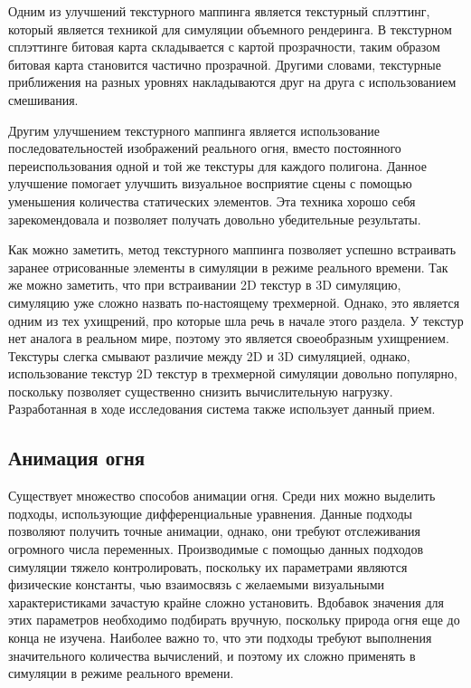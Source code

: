 Одним из улучшений текстурного маппинга является текстурный сплэттинг, который
является техникой для симуляции объемного рендеринга. В текстурном сплэттинге
битовая карта складывается с картой прозрачности, таким образом битовая карта
становится частично прозрачной. Другими словами, текстурные приближения на
разных уровнях накладываются друг на друга с использованием смешивания.

Другим улучшением текстурного маппинга является использование
последовательностей изображений реального огня, вместо постоянного
переиспользования одной и той же текстуры для каждого полигона. Данное улучшение
помогает улучшить визуальное восприятие сцены с помощью уменьшения количества
статических элементов. Эта техника хорошо себя зарекомендовала и позволяет
получать довольно убедительные результаты.

Как можно заметить, метод текстурного маппинга позволяет успешно встраивать
заранее отрисованные элементы в симуляции в режиме реального времени. Так же
можно заметить, что при встраивании 2D текстур в 3D симуляцию, симуляцию уже
сложно назвать по-настоящему трехмерной. Однако, это является одним из тех
ухищрений, про которые шла речь в начале этого раздела. У текстур нет аналога в
реальном мире, поэтому это является своеобразным ухищрением. Текстуры слегка
смывают различие между 2D и 3D симуляцией, однако, использование текстур 2D
текстур в трехмерной симуляции довольно популярно, поскольку позволяет
существенно снизить вычислительную нагрузку. Разработанная в ходе исследования
система также использует данный прием.

\subsection{Анимация огня}

Существует множество способов анимации огня. Среди них можно выделить подходы,
использующие дифференциальные уравнения. Данные подходы позволяют получить
точные анимации, однако, они требуют отслеживания огромного числа переменных.
Производимые с помощью данных подходов симуляции тяжело контролировать,
поскольку их параметрами являются физические константы, чью взаимосвязь с
желаемыми визуальными характеристиками зачастую крайне сложно установить.
Вдобавок значения для этих параметров необходимо подбирать вручную, поскольку
природа огня еще до конца не изучена. Наиболее важно то, что эти подходы требуют
выполнения значительного количества вычислений, и поэтому их сложно применять в
симуляции в режиме реального времени.


